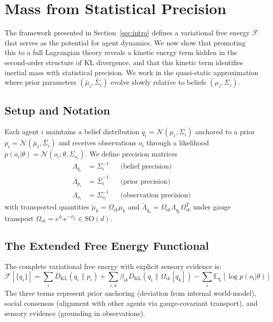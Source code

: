 \documentclass[11pt]{article}
\begin{document}
\section{Mass from Statistical Precision}
\label{sec:mass}

The framework presented in Section~\ref{sec:intro} defines a variational free energy $\mathcal{F}$ that serves as the potential for agent dynamics. We now show that promoting this to a full Lagrangian theory reveals a kinetic energy term hidden in the second-order structure of KL divergence, and that this kinetic term identifies inertial mass with statistical precision. We work in the quasi-static approximation where prior parameters $(\bar{\mu}_i, \bar{\Sigma}_i)$ evolve slowly relative to beliefs $(\mu_i, \Sigma_i)$.

\subsection{Setup and Notation}

Each agent $i$ maintains a belief distribution $q_i = \mathcal{N}(\mu_i, \Sigma_i)$ anchored to a prior $p_i = \mathcal{N}(\bar{\mu}_i, \bar{\Sigma}_i)$ and receives observations $o_i$ through a likelihood $p(o_i | \theta) = \mathcal{N}(o_i; \theta, \Sigma_{o_i})$. We define precision matrices
\begin{align}
\Lambda_{q_i} &= \Sigma_i^{-1} & &\text{(belief precision)} \\
\bar{\Lambda}_{p_i} &= \bar{\Sigma}_i^{-1} & &\text{(prior precision)} \\
\Lambda_{o_i} &= \Sigma_{o_i}^{-1} & &\text{(observation precision)}
\end{align}
with transported quantities $\tilde{\mu}_k = \Omega_{ik}\mu_k$ and $\tilde{\Lambda}_{q_k} = \Omega_{ik}\Lambda_{q_k}\Omega_{ik}^T$ under gauge transport $\Omega_{ik} = e^{\phi_i}e^{-\phi_k} \in \mathrm{SO}(d)$.

\subsection{The Extended Free Energy Functional}

The complete variational free energy with explicit sensory evidence is:
\begin{equation}
\mathcal{F}[\{q_i\}] = \sum_i D_{\mathrm{KL}}(q_i \| p_i) + \sum_{i,k} \beta_{ik} D_{\mathrm{KL}}(q_i \| \Omega_{ik}[q_k]) - \sum_i \mathbb{E}_{q_i}[\log p(o_i | \theta)]
\label{eq:extended_free_energy}
\end{equation}
The three terms represent prior anchoring (deviation from internal world-model), social consensus (alignment with other agents via gauge-covariant transport), and sensory evidence (grounding in observations).
\end{document}
